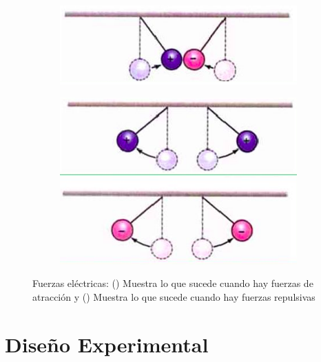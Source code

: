\documentclass[10pt,journal]{IEEEtran}
\begin{document}
\begin{figure}
\centering
\begin{subfigure}{.4\textwidth}
\includegraphics[width = .5\linewidth]{Figuras/fuerzaatraccion.PNG}
\caption{}
\label{Fig: Fuerzas_a}
\end{subfigure}%
\centering
\begin{subfigure}{.4\textwidth}
\includegraphics[width = .5\linewidth]{Figuras/fuerzarepulsion.PNG}
\caption{}
\label{Fig: Fuerzas_b}
\end{subfigure}
\caption{Fuerzas eléctricas: () Muestra lo que sucede cuando hay fuerzas de atracción y () Muestra lo que sucede cuando hay fuerzas repulsivas}
\label{Fig: Fuerzas_unidas}
\end{figure}
\section{Diseño Experimental}
\end{document}
